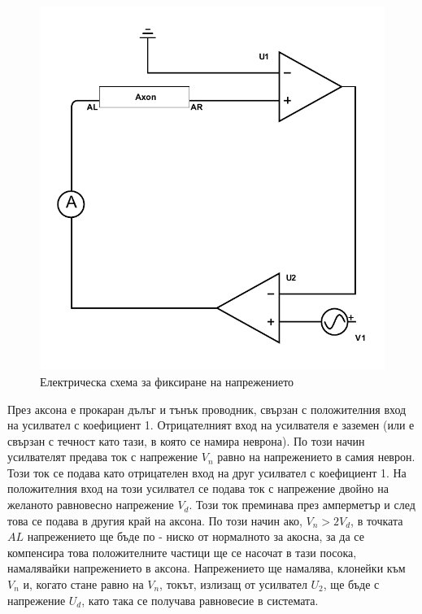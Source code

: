 \documentclass{article}
\numberwithin{equation}{section}
\begin{document}
        \begin{figure}[H]
            \centering
            \includegraphics[scale=0.6]{./schemas/voltage-clamp.pdf}
            \caption{Електрическа схема за фиксиране на напрежението}
        \end{figure}

        През аксона е прокаран дълъг и тънък проводник, свързан с положителния вход на усилвател с коефициент 1. Отрицателният вход на усилвателя
        е заземен (или е свързан с течност като тази, в която се намира неврона). По този начин усилвателят предава ток с напрежение $V_n$ равно на
        напрежението в самия неврон. Този ток се подава като отрицателен вход на друг усилвател с коефициент 1. На положителния вход на този
        усилвател се подава ток с напрежение двойно на желаното равновесно напрежение $V_d$. Този ток преминава през амперметър и след това се подава в
        другия край на аксона. По този начин ако, $V_n > 2V_d$, в точката $AL$ напрежението ще бъде по - ниско от нормалното за акосна, за да се
        компенсира това положителните частици ще се насочат в тази посока, намалявайки напрежението в аксона. Напрежението ще намалява, клонейки към
        $V_n$ и, когато стане равно на $V_n$, токът, излизащ от усилвател $U_2$, ще бъде с напрежение $U_d$, като така се получава равновесие в
        системата.
\end{document}

